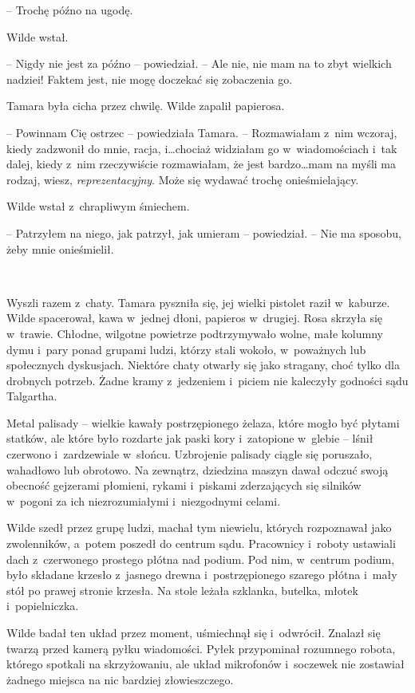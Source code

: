 \documentclass[oneside,polish,11pt,sfheadings]{mwbk}
\begin{document}
-- Trochę późno na ugodę.

Wilde wstał. 

-- Nigdy nie jest za późno -- powiedział. -- Ale nie, nie mam
na to zbyt wielkich nadziei! Faktem jest, nie mogę doczekać się
zobaczenia go.

Tamara była cicha przez chwilę. Wilde zapalił papierosa.

-- Powinnam Cię ostrzec -- powiedziała Tamara. -- Rozmawiałam z~nim
wczoraj, kiedy zadzwonił do mnie, racja, i\ldots chociaż widziałam go w~wiadomościach i~tak dalej, kiedy z~nim rzeczywiście rozmawiałam, że jest
bardzo\ldots mam na myśli ma rodzaj, wiesz, \emph{reprezentacyjny}. Może
się wydawać trochę onieśmielający.

Wilde wstał z~chrapliwym śmiechem.

-- Patrzyłem na niego, jak patrzył, jak umieram -- powiedział. -- Nie ma
sposobu, żeby mnie onieśmielił.

~

Wyszli razem z~chaty. Tamara pyszniła się, jej wielki pistolet raził w~kaburze. Wilde spacerował, kawa w~jednej dłoni, papieros w~drugiej. Rosa
skrzyła się w~trawie. Chłodne, wilgotne powietrze podtrzymywało wolne,
małe kolumny dymu i~pary ponad grupami ludzi, którzy stali wokoło, w~poważnych lub społecznych dyskusjach. Niektóre chaty otwarły się jako
stragany, choć tylko dla drobnych potrzeb. Żadne kramy z~jedzeniem i~piciem nie kaleczyły godności sądu Talgartha.

Metal palisady -- wielkie kawały postrzępionego żelaza, które mogło być
płytami statków, ale które było rozdarte jak paski kory i~zatopione w~glebie -- lśnił czerwono i~zardzewiale w~słońcu. Uzbrojenie palisady
ciągle się poruszało, wahadłowo lub obrotowo. Na zewnątrz, dziedzina
maszyn dawał odczuć swoją obecność gejzerami płomieni, rykami i~piskami
zderzających się silników w~pogoni za ich niezrozumiałymi i~niezgodnymi
celami.

Wilde szedł przez grupę ludzi, machał tym niewielu, których rozpoznawał
jako zwolenników, a~potem poszedł do centrum sądu. Pracownicy i~roboty
ustawiali dach z~czerwonego prostego płótna nad podium. Pod nim, w~centrum podium, było składane krzesło z~jasnego drewna i~postrzępionego
szarego płótna i~mały stół po prawej stronie krzesła. Na stole leżała
szklanka, butelka, młotek i~popielniczka.

Wilde badał ten układ przez moment, uśmiechnął się i~odwrócił. Znalazł
się twarzą przed kamerą pyłku wiadomości. Pyłek przypominał rozumnego
robota, którego spotkali na skrzyżowaniu, ale układ mikrofonów i~soczewek nie zostawiał żadnego miejsca na nic bardziej złowieszczego.
\end{document}
